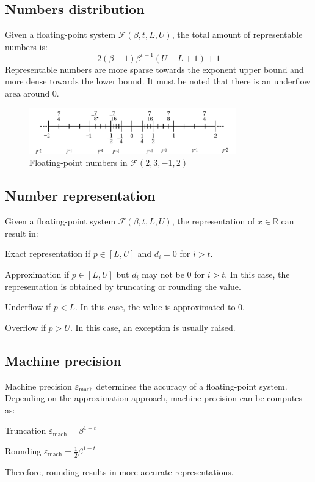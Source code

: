 \subsection{Numbers distribution}
Given a floating-point system $\mathcal{F}(\beta, t, L, U)$, the total amount of representable numbers is:
\begin{equation*}
    2(\beta-1) \beta^{t-1} (U-L+1)+1
\end{equation*}
%
Representable numbers are more sparse towards the exponent upper bound and more dense towards the lower bound.
It must be noted that there is an underflow area around 0.
\begin{figure}[h]
    \centering
    \includegraphics[width=0.8\textwidth]{img/floatingpoint_range.png}
    \caption{Floating-point numbers in $\mathcal{F}(2, 3, -1, 2)$}
\end{figure}


\subsection{Number representation}
Given a floating-point system $\mathcal{F}(\beta, t, L, U)$, the representation of $x \in \mathbb{R}$ can result in:
\begin{descriptionlist}
    \item[Exact representation] 
        if $p \in [L, U]$ and $d_i=0$ for $i>t$.

    \item[Approximation] 
        if $p \in [L, U]$ but $d_i$ may not be 0 for $i>t$. 
        In this case, the representation is obtained by truncating or rounding the value.

    \item[Underflow] 
        if $p < L$. In this case, the value is approximated to 0.

    \item[Overflow] 
        if $p > U$. In this case, an exception is usually raised.
\end{descriptionlist}


\subsection{Machine precision}
Machine precision $\varepsilon_{\text{mach}}$ determines the accuracy of a floating-point system. 
Depending on the approximation approach, machine precision can be computes as:
\begin{descriptionlist}
    \item[Truncation] $\varepsilon_{\text{mach}} = \beta^{1-t}$
    \item[Rounding] $\varepsilon_{\text{mach}} = \frac{1}{2}\beta^{1-t}$
\end{descriptionlist}
Therefore, rounding results in more accurate representations.

